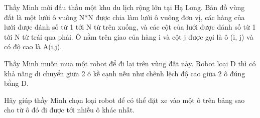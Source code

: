 Thầy Minh mới đấu thầu một khu du lịch rộng lớn tại Hạ Long. Bản đồ vùng đất là một lưới ô vuông N*N được chia làm lưới ô vuông đơn vị, các hàng của lưới được đánh số từ 1 tới N từ trên xuống, và các cột của lưới được đánh số từ 1 tới N từ trái qua phải. Ô nằm trên giao của hàng i và cột j được gọi là ô (i, j) và có độ cao là A(i,j).  

   Thầy Minh muốn mua một robot để đi lại trên vùng đất này. Robot loại D thì có khả năng di chuyển giữa 2 ô kề cạnh nếu như chênh lệch độ cao giữa 2 ô đúng bằng D.  

   Hãy giúp thầy Minh chọn loại robot để có thể đặt xe vào một ô trên bảng sao cho từ ô đó đi được tới nhiều ô khác nhất.  

\